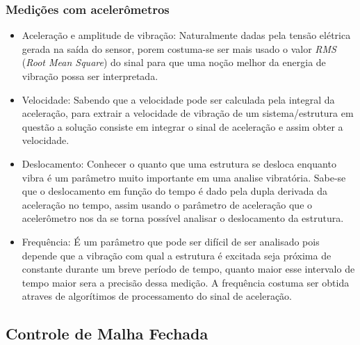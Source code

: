 \subsubsection{Medições com acelerômetros}
\begin{itemize}
  \item Aceleração e amplitude de vibração: Naturalmente dadas pela tensão elétrica gerada na saída do sensor, porem costuma-se ser mais usado o valor \textit{RMS} (\textit{Root Mean Square}) do sinal para que uma noção melhor da energia de vibração possa ser interpretada.
  \item Velocidade: Sabendo que a velocidade pode ser calculada pela integral da aceleração, para extrair a velocidade de vibração de um sistema/estrutura em questão a solução consiste em integrar o sinal de aceleração e assim obter a velocidade.
  \item Deslocamento: Conhecer o quanto que uma estrutura se desloca enquanto vibra é um parâmetro muito importante em uma analise vibratória. Sabe-se que o deslocamento em função do tempo é dado pela dupla derivada da aceleração no tempo, assim usando o parâmetro de aceleração que o acelerômetro nos da se torna possível analisar o deslocamento da estrutura.
  \item Frequência: É um parâmetro que pode ser difícil de ser analisado pois depende que a vibração com qual a estrutura é excitada seja próxima de constante durante um breve período de tempo, quanto maior esse intervalo de tempo maior sera a precisão dessa medição. A frequência costuma ser obtida atraves de algorítimos de processamento do sinal de aceleração.
\end{itemize}
\subsection{Controle de Malha Fechada}
